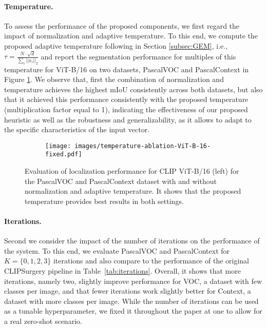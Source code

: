 \documentclass[10pt,twocolumn,letterpaper]{article}
\begin{document}
\paragraph{Temperature.} \label{subsec:temp}
To assess the performance of the proposed components, we first regard the impact of normalization and adaptive temperature. To this end, we compute the proposed adaptive temperature following in Section \ref{subsec:GEM}, i.e., $\tau = \frac{N \cdot \sqrt{d}}{\sum_i ||x_i||_2}$ and report the segmentation performance for multiples of this temperature for ViT-B/16 on two datasets, PascalVOC and PascalContext in Figure \ref{fig:temp-ablation}. 
We observe that, first the combination of normalization and temperature achieves the highest mIoU consistently across both datasets, but also that it achieved this performance consistently with the proposed temperature (multiplication factor equal to 1), indicating the effectiveness of our proposed heuristic as well as the robustness and generalizability, as it allows to adapt to the specific characteristics of the input vector. 
\begin{figure}[t] 
     \centering
     \begin{subfigure}[b]{0.45\textwidth}
         \centering
         \texttt{[image: images/temperature-ablation-ViT-B-16-fixed.pdf]}
    \end{subfigure}
    \vspace{-3mm}
    \caption{Evaluation of localization performance for CLIP ViT-B/16 (left) for the PascalVOC and PascalContext dataset with and without normalization and adaptive temperature. It shows that the proposed temperature provides best results in both settings.}\label{fig:temp-ablation}
\end{figure}
\vspace{-5mm}
\paragraph{Iterations.} Second we consider the impact of the number of iterations on the performance of the system. To this end, we evaluate PascalVOC and PascalContext for $K=\{0, 1, 2, 3\}$ iterations and also compare to the performance of the original CLIPSurgery pipeline in Table~\ref{tab:iterations}.  Overall, it shows that more iterations, namely two, slightly improve performance for VOC, a dataset with few classes per image, and that fewer iterations work slightly better for Context, a dataset with more classes per image. While the number of iterations can be used as a tunable hyperparameter, we fixed it throughout the paper at one to allow for a real zero-shot scenario. 
\end{document}
